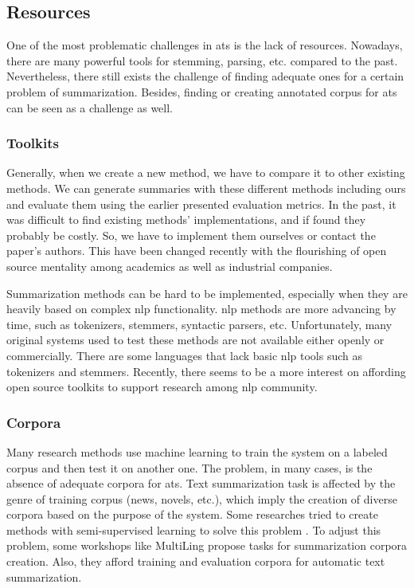 \subsection{Resources}

One of the most problematic challenges in \ac{ats} is the lack of resources. 
Nowadays, there are many powerful tools for stemming, parsing, etc. compared to the past. 
Nevertheless, there still exists the challenge of finding adequate ones for a certain problem of summarization. 
Besides, finding or creating annotated corpus for \ac{ats} can be seen as a challenge as well.

\subsubsection{Toolkits}

Generally, when we create a new method, we have to compare it to other existing methods.
We can generate summaries with these different methods including ours and evaluate them using the earlier presented evaluation metrics.
In the past, it was difficult to find existing methods' implementations, and if found they probably be costly.
So, we have to implement them ourselves or contact the paper's authors. 
This have been changed recently with the flourishing of open source mentality among academics as well as industrial companies. 

Summarization methods can be hard to be implemented, especially when they are heavily based on complex \ac{nlp} functionality. 
\ac{nlp} methods are more advancing by time, such as tokenizers, stemmers, syntactic parsers, etc.
Unfortunately, many original systems used to test these methods are not available either openly or commercially. 
There are some languages that lack basic \ac{nlp} tools such as tokenizers and stemmers.
Recently, there seems to be a more interest on affording open source toolkits to support research among \ac{nlp} community.

\subsubsection{Corpora} 

Many research methods use machine learning to train the system on a labeled corpus and then test it on another one. 
The problem, in many cases, is the absence of adequate corpora for \ac{ats}. 
Text summarization task is affected by the genre of training corpus (news, novels, etc.), which imply the creation of diverse corpora based on the purpose of the system.
Some researches tried to create methods with semi-supervised learning to solve this problem \citep{02-amini-gallinari}.
To adjust this problem, some workshops like MultiLing propose tasks for summarization corpora creation. 
Also, they afford training and evaluation corpora for automatic text summarization.

